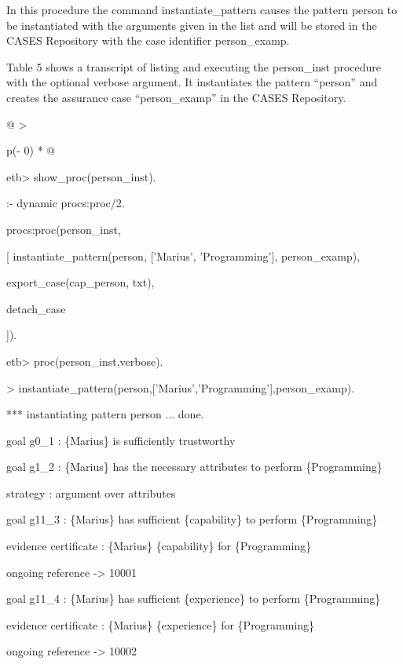 \documentclass[12pt,twoside,a4paper]{article}
\begin{document}
In this procedure the command instantiate\_pattern causes the pattern person to be instantiated with the arguments given in the list and will be stored in the CASES Repository with the case identifier person\_examp.

Table 5 shows a transcript of listing and executing the person\_inst procedure with the optional verbose argument. It instantiates the pattern ``person'' and creates the assurance case ``person\_examp'' in the CASES Repository.

\begin{longtable}[]{@{}
  >{\raggedright\arraybackslash}p{(\columnwidth - 0\tabcolsep) * }@{}}
\caption{\protect\hypertarget{_Ref175577865}{}{}Table 5 Running the person\_inst procedure}\tabularnewline
\toprule
\begin{minipage}[b]{\linewidth}\raggedright
etb\textgreater{} show\_proc(person\_inst).

:- dynamic procs:proc/2.

procs:proc(person\_inst,

{[} instantiate\_pattern(person, {[}'Marius', 'Programming'{]}, person\_examp),

export\_case(cap\_person, txt),

detach\_case

{]}).

etb\textgreater{} proc(person\_inst,verbose).

\textgreater{} instantiate\_pattern(person,{[}'Marius','Programming'{]},person\_examp).

*** instantiating pattern person ... done.

goal g0\_1 : \{Marius\} is sufficiently trustworthy

goal g1\_2 : \{Marius\} has the necessary attributes to perform \{Programming\}

strategy : argument over attributes

goal g11\_3 : \{Marius\} has sufficient \{capability\} to perform \{Programming\}

evidence certificate : \{Marius\} \{capability\} for \{Programming\}

ongoing reference -\textgreater{} 10001

goal g11\_4 : \{Marius\} has sufficient \{experience\} to perform \{Programming\}

evidence certificate : \{Marius\} \{experience\} for \{Programming\}

ongoing reference -\textgreater{} 10002


\end{minipage}
\end{longtable}
\end{document}
